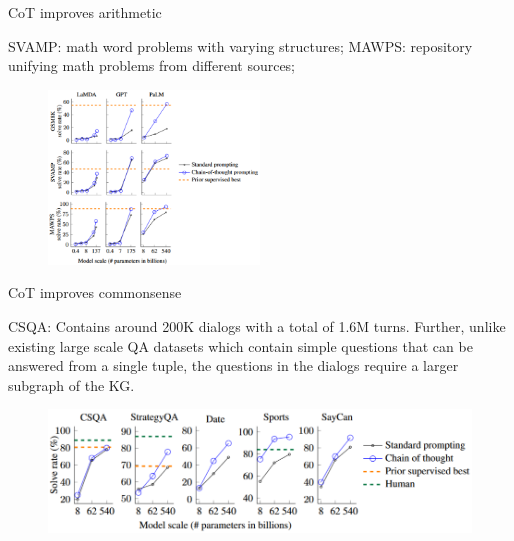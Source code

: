 \begin{vbframe}{CoT improves arithmetic}


SVAMP: math word problems with varying structures; MAWPS:
repository unifying math problems from different sources;

\begin{figure}
    \centering
    \includegraphics[width=0.5\textwidth]{figure/cot_performance1.png}
\end{figure}


\end{vbframe}


\begin{vbframe}{CoT improves commonsense}

\vfill

CSQA: Contains around 200K dialogs with a total of 1.6M
turns. Further, unlike existing large scale QA datasets
which contain simple questions that can be answered from a
single tuple, the questions in the dialogs require a larger
subgraph of the KG. 


\begin{figure}
    \centering
    \includegraphics{figure/cot_performance2.png}\\
\end{figure}

\vfill

\end{vbframe}


